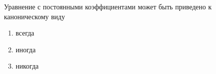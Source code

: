 Уравнение с постоянными коэффициентами может быть приведено к каноническому виду

\begin{enumerate}[label=\arabic*)]
    \item всегда
    \item иногда
    \item никогда
\end{enumerate}

